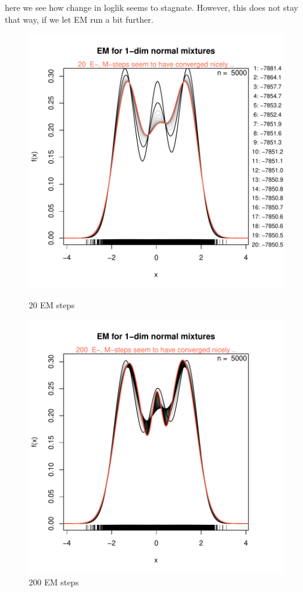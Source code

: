 here we see how change in loglik seems to stagnate. However, this does not stay that way, if we let EM run a bit further.


\begin{figure}[h]
    \centering
    \begin{minipage}{0.45\textwidth}
    \centering
\includegraphics{chapter1-fignor1mixEx}
    \caption{20 EM steps}
    \end{minipage}\hfill
    \begin{minipage}{0.45\textwidth}
    \centering
\includegraphics{chapter1-figplotemsteps}
    \caption{200 EM steps}
    \end{minipage}
    \label{adfafdafds}
\end{figure}

